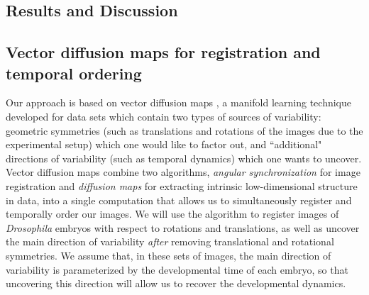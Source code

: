 \documentclass{pnastwo}
\begin{document}
\begin{article}
\section{Results and Discussion}

\subsection{Vector diffusion maps for registration and temporal ordering}

%
%
%
Our approach is based on vector diffusion maps \cite{singer2012vector}, a manifold learning
technique developed for data sets which contain two types of sources of variability:
geometric symmetries (such as translations and rotations of the images due to the experimental setup) which one would like to factor out,
and ``additional" directions of variability (such as temporal dynamics) which one wants to uncover.
%
Vector diffusion maps combine two algorithms, {\em angular synchronization} \cite{singer2011angular} for image registration and {\em diffusion maps} \cite{coifman2005geometric} for extracting intrinsic low-dimensional structure in data, into a single computation that allows us to simultaneously register and temporally order our images.
%
%
We will use the algorithm to register images of {\it Drosophila} embryos with respect to rotations and translations, as well as uncover the main direction of variability {\it after} removing translational and rotational symmetries.
%
We assume that, in these sets of images, the main direction of variability is parameterized by the developmental time of each embryo, so that uncovering this direction will allow us to recover the developmental dynamics.


\end{article}
\end{document}
